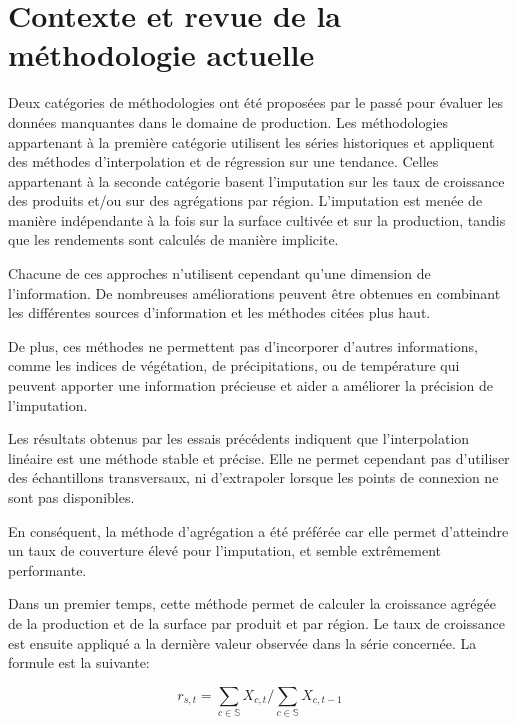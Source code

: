 \documentclass[nojss]{jss}\usepackage{graphicx, color}
\begin{document}
\section{Contexte et revue de la m\'{e}thodologie actuelle}
Deux cat\'{e}gories de m\'{e}thodologies ont \'{e}t\'{e} propos\'{e}es
par le pass\'{e} pour \'{e}valuer les donn\'{e}es manquantes dans le
domaine de production. Les m\'{e}thodologies appartenant \`{a} la
premi\`{e}re cat\'{e}gorie utilisent les s\'{e}ries historiques et
appliquent des m\'{e}thodes d'interpolation et de r\'{e}gression sur
une tendance.  Celles appartenant \`{a} la seconde cat\'{e}gorie
basent l'imputation sur les taux de croissance des produits et/ou sur
des agr\'{e}gations par r\'{e}gion. L'imputation est men\'{e}e de
mani\`{e}re ind\'{e}pendante \`{a} la fois sur la surface cultiv\'{e}e
et sur la production, tandis que les rendements sont calcul\'{e}s de
mani\`{e}re implicite.


Chacune de ces approches n'utilisent cependant qu'une dimension de
l'information. De nombreuses am\'{e}liorations peuvent \^{e}tre obtenues
en combinant les diff\'{e}rentes sources d'information et les
m\'{e}thodes cit\'{e}es plus haut.

De plus, ces m\'{e}thodes ne permettent pas d'incorporer d'autres
informations, comme les indices de v\'{e}g\'{e}tation, de
pr\'{e}cipitations, ou de temp\'{e}rature qui peuvent apporter une
information pr\'{e}cieuse et aider a am\'{e}liorer la pr\'{e}cision de
l'imputation.


Les r\'{e}sultats obtenus par les essais pr\'{e}c\'{e}dents indiquent
que l'interpolation lin\'{e}aire est une m\'{e}thode stable et
pr\'{e}cise. Elle ne permet cependant pas d'utiliser des
\'{e}chantillons transversaux, ni d'extrapoler lorsque les points de
connexion ne sont pas disponibles.

En cons\'{e}quent, la m\'{e}thode d'agr\'{e}gation a \'{e}t\'{e}
pr\'{e}f\'{e}r\'{e}e car elle permet d'atteindre un taux de couverture
\'{e}lev\'{e} pour l'imputation, et semble extr\^{e}mement
performante.


Dans un premier temps, cette m\'{e}thode permet de calculer la
croissance agr\'{e}g\'{e}e de la production et de la surface par
produit et par r\'{e}gion.  Le taux de croissance est ensuite
appliqu\'{e} a la derni\`{e}re valeur observ\'{e}e dans la s\'{e}rie
concern\'{e}e. La formule est la suivante:

\begin{equation}
  \label{eq:aggregateGrowth}
  r_{s, t} = \sum_{c \in \mathbb{S}} X_{c, t}/\sum_{c \in \mathbb{S}} X_{c, t-1}
\end{equation}
\end{document}
